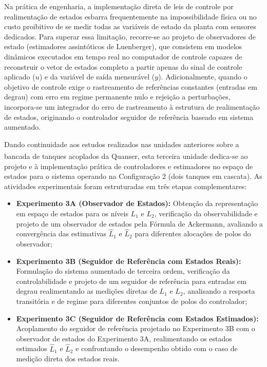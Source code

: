 \documentclass[a4paper,12pt]{article}
\begin{document}
\begin{justify}
    \hspace{4ex}Na prática de engenharia, a implementação direta de leis de controle por realimentação de estados esbarra frequentemente na impossibilidade física ou no custo proibitivo de se medir todas as variáveis de estado da planta com sensores dedicados. Para superar essa limitação, recorre-se ao projeto de observadores de estado (estimadores assintóticos de Luenberger), que consistem em modelos dinâmicos executados em tempo real no computador de controle capazes de reconstruir o vetor de estados completo a partir apenas do sinal de controle aplicado ($u$) e da variável de saída mensurável ($y$). Adicionalmente, quando o objetivo de controle exige o rastreamento de referências constantes (entradas em degrau) com erro em regime permanente nulo e rejeição a perturbações, incorpora-se um integrador do erro de rastreamento à estrutura de realimentação de estados, originando o controlador seguidor de referência baseado em sistema aumentado.
\end{justify}

\begin{justify}
    \hspace{4ex}Dando continuidade aos estudos realizados nas unidades anteriores sobre a bancada de tanques acoplados da Quanser\textsuperscript{\textregistered}, esta terceira unidade dedica-se ao projeto e à implementação prática de controladores e estimadores no espaço de estados para o sistema operando na Configuração 2 (dois tanques em cascata). As atividades experimentais foram estruturadas em três etapas complementares:
\end{justify}

\begin{itemize}
    \item \textbf{Experimento 3A (Observador de Estados):} Obtenção da representação em espaço de estados para os níveis $L_1$ e $L_2$, verificação da observabilidade e projeto de um observador de estados pela Fórmula de Ackermann, avaliando a convergência das estimativas $\hat{L}_1$ e $\hat{L}_2$ para diferentes alocações de polos do observador;
    \item \textbf{Experimento 3B (Seguidor de Referência com Estados Reais):} Formulação do sistema aumentado de terceira ordem, verificação da controlabilidade e projeto de um seguidor de referência para entradas em degrau realimentando as medições diretas de $L_1$ e $L_2$, analisando a resposta transitória e de regime para diferentes conjuntos de polos do controlador;
    \item \textbf{Experimento 3C (Seguidor de Referência com Estados Estimados):} Acoplamento do seguidor de referência projetado no Experimento 3B com o observador de estados do Experimento 3A, realimentando os estados estimados $\hat{L}_1$ e $\hat{L}_2$ e confrontando o desempenho obtido com o caso de medição direta dos estados reais.
\end{itemize}
\end{document}
